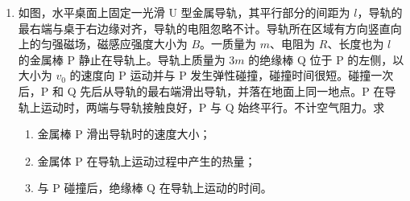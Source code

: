 \documentclass[\gkver]{gaokaozhenti}
\begin{document}
\begin{enumerate}
{\begin{enumerate}
	\item
	$\frac{{5\sqrt {mgh{E_p}} }}{{2\Umg}}$

\end{enumerate}
}

\item
如图，水平桌面上固定一光滑 U 型金属导轨，其平行部分的间距为 $l$，导轨的最右端与桌于右边缘对齐，导轨的电阻忽略不计。导轨所在区域有方向竖直向上的匀强磁场，磁感应强度大小为 $B$。一质量为 $m$、电阻为 $R$、长度也为 $l$ 的金属棒 P 静止在导轨上。导轨上质量为 3$m$ 的绝缘棒 Q 位于 P 的左侧，以大小为 $v_{0}$ 的速度向 P 运动并与 P 发生弹性碰撞，碰撞时间很短。碰撞一次后，P 和 Q 先后从导轨的最右端滑出导轨，并落在地面上同一地点。P 在导轨上运动时，两端与导轨接触良好，P 与 Q 始终平行。不计空气阻力。求
\begin{enumerate}
	\item
	金属棒 P 滑出导轨时的速度大小；
	\item
	金属体 P 在导轨上运动过程中产生的热量；
	\item
	与 P 碰撞后，绝缘棒 Q 在导轨上运动的时间。
\end{enumerate}
\end{enumerate}
\end{document}
